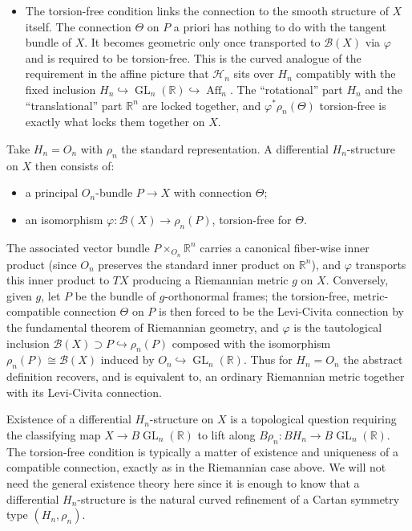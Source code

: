 \documentclass[a4paper,11pt]{article}
\begin{document}
\begin{appendices}
\begin{remark}
\begin{itemize}
\item The torsion-free condition links the connection to the smooth
structure of $X$ itself. The connection $\Theta$ on $P$ a priori has nothing to do with the tangent bundle of $X$. It becomes geometric only once transported to $\mathcal B(X)$ via $\varphi$ and is required to be torsion-free. This is the curved analogue of the requirement in the affine picture that $\mathcal H_n$ sits over $H_n$ compatibly with the fixed inclusion $H_n\hookrightarrow\operatorname{GL}_n(\mathbb{R})\hookrightarrow\operatorname{Aff}_n$. The ``rotational'' part $H_n$ and the ``translational''
part $\mathbb{R}^n$ are locked together, and $\varphi^*\rho_n(\Theta)$
torsion-free is exactly what locks them together on $X$.
\end{itemize}
\end{remark}

\begin{example}
Take $H_n = O_n$ with $\rho_n$ the standard representation. A differential $H_n$-structure on $X$ then consists of:
\begin{itemize}
\item a principal $O_n$-bundle $P\to X$ with connection $\Theta$;
\item an isomorphism $\varphi:\mathcal B(X)\to\rho_n(P)$, torsion-free for $\Theta$.
\end{itemize}
The associated vector bundle $P\times_{O_n}\mathbb{R}^n$ carries a canonical fiber-wise inner product (since $O_n$ preserves the standard inner product on $\mathbb{R}^n$), and $\varphi$ transports this inner product to $TX$ producing a Riemannian metric $g$ on $X$. Conversely, given $g$, let $P$ be
the bundle of $g$-orthonormal frames; the torsion-free, metric-compatible
connection $\Theta$ on $P$ is then forced to be the Levi-Civita connection by the fundamental theorem of Riemannian geometry, and $\varphi$ is the tautological inclusion $\mathcal B(X)\supset P \hookrightarrow \rho_n(P)$
composed with the isomorphism $\rho_n(P)\cong \mathcal{B}(X)$ induced by $O_n\hookrightarrow \operatorname{GL}_n(\mathbb{R})$. Thus for $H_n=O_n$ the abstract definition recovers, and is equivalent to, an ordinary Riemannian
metric together with its Levi-Civita connection.
\end{example}

\begin{remark}
Existence of a differential $H_n$-structure on $X$ is a topological question requiring the classifying map $X\to B\operatorname{GL}_n(\mathbb{R})$ to
lift along $B\rho_n:BH_n\to B\operatorname{GL}_n(\mathbb{R})$. The
torsion-free condition is typically a matter of existence and uniqueness of a compatible connection, exactly as in the Riemannian case above. We will not need the general existence theory here since it is enough to know that a differential $H_n$-structure is the natural curved refinement of a Cartan symmetry type $(H_n,\rho_n)$.
\end{remark}


\end{appendices}
\end{document}
